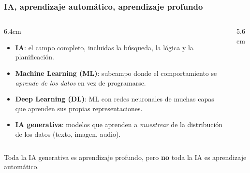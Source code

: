 \documentclass[aspectratio=169, 10pt]{beamer}
\begin{document}
\begin{frame}
\frametitle{IA, aprendizaje automático, aprendizaje profundo}
\begin{columns}[T]
\begin{column}{6.4cm}
\begin{itemize}
	\item \textbf{IA}: el campo completo, incluidas la b\'usqueda, la l\'ogica y la planificaci\'on.
	\item \textbf{Machine Learning (ML)}: subcampo donde el comportamiento se \emph{aprende de los datos} en vez de programarse.
	\item \textbf{Deep Learning (DL)}: ML con redes neuronales de muchas capas que aprenden sus propias representaciones.
	\item \textbf{IA generativa}: modelos que aprenden a \emph{muestrear} de la distribuci\'on de los datos (texto, imagen, audio).
\end{itemize}
\end{column}
\begin{column}{5.6cm}
\begin{center}
\end{center}
\end{column}
\end{columns}
\vspace{0.3em}
\footnotesize Toda la IA generativa es aprendizaje profundo, pero \textbf{no} toda la IA es aprendizaje autom\'atico.
\end{frame}
\end{document}

